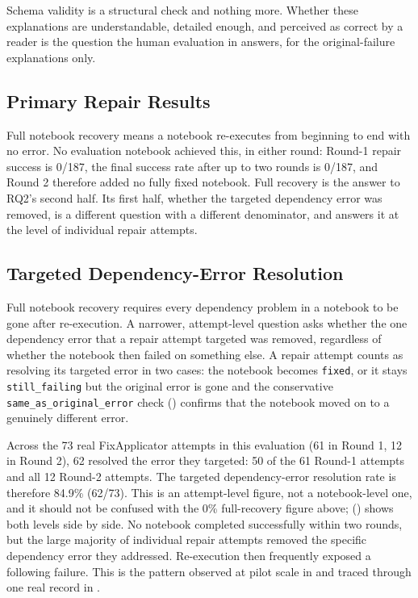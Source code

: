 Schema validity is a structural check and nothing more. Whether these
explanations are understandable, detailed enough, and perceived as correct
by a reader is the question the human evaluation in 
answers, for the original-failure explanations only.

\subsection{Primary Repair Results}
\label{sec:v-final-primary}

Full notebook recovery means a notebook re-executes from beginning to
end with no error. No evaluation notebook achieved this, in either
round: Round-1 repair success is 0/187, the final success rate after up
to two rounds is 0/187, and Round 2 therefore added no fully fixed
notebook. Full recovery is the answer to RQ2's second half. Its first
half, whether the targeted dependency error was removed, is a different
question with a different denominator, and 
answers it at the level of individual repair attempts.

\subsection{Targeted Dependency-Error Resolution}
\label{sec:v-final-targeted}

Full notebook recovery requires every dependency problem in a notebook
to be gone after re-execution. A narrower, attempt-level question asks
whether the one dependency error that a repair attempt targeted was
removed, regardless of whether the notebook then failed on something
else. A repair attempt counts as resolving its targeted error in two
cases: the notebook becomes \texttt{fixed}, or it stays
\texttt{still\_failing} but the original error is gone and the
conservative \texttt{same\_as\_original\_error} check
() confirms that the notebook moved on to a
genuinely different error.

Across the 73 real FixApplicator attempts in this evaluation (61 in
Round 1, 12 in Round 2), 62 resolved the error they targeted: 50 of the 61
Round-1 attempts and all 12 Round-2 attempts. The targeted
dependency-error resolution rate is therefore 84.9\% (62/73). This is an
attempt-level figure, not a notebook-level one, and it should not be
confused with the 0\% full-recovery figure above;
 () shows both levels
side by side. No notebook completed successfully within two rounds, but
the large majority of individual repair attempts removed the specific
dependency error they addressed. Re-execution then frequently exposed a
following failure. This is the pattern observed at pilot scale in
 and traced through one real record in
.

